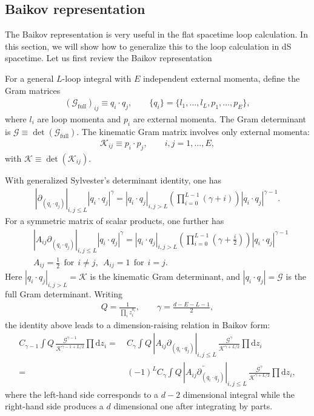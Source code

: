 \documentclass[a4paper]{article}
\newcommand{\n}{\nonumber}
\def\di{{\mathrm{d}}}
\newcommand{\mG}{\mathcal{G}}
\newcommand{\mK}{\mathcal{K}}
\begin{document}
\subsection{Baikov representation}
The Baikov representation is very useful in the flat spacetime loop calculation. In this section, we will show how to generalize this to the loop calculation in dS spacetime. Let us first review the Baikov representation

For a general $L$-loop integral with $E$ independent external momenta, define the Gram matrices
\begin{align}
	(\mG_{\text{full}})_{ij} \equiv q_i \cdotp q_j, \qquad \{q_i\} = \{l_1,\dots,l_L,p_1,\dots,p_E\},
\end{align}
where $l_i$ are loop momenta and $p_i$ are external momenta. The Gram determinant is $\mG \equiv \det(\mG_{\text{full}})$. The kinematic Gram matrix involves only external momenta:
\begin{align}
	\mK_{ij} \equiv p_i \cdotp p_j, \qquad i,j = 1,\dots,E,
\end{align}
with $\mK \equiv \det(\mK_{ij})$.

With generalized Sylvester's determinant identity, one has
\begin{align}
	|\partial_{(q_i\cdotp q_j)}|_{i,j\leq L} |q_i\cdotp q_j|^\gamma
	= |q_i\cdotp q_j|_{i,j> L}\left(\prod_{i=0}^{L-1} (\gamma+i)\right)|q_i\cdotp q_j|^{\gamma-1}.
\end{align}
For a symmetric matrix of scalar products, one further has
\begin{align}
	&|A_{ij} \partial_{(q_i\cdotp q_j)}|_{i,j\leq L} |q_i\cdotp q_j|^\gamma = |q_i\cdotp q_j|_{i,j> L}  \left(\prod_{i=0}^{L-1} \left(\gamma+\frac{i}{2}\right)\right)   |q_i\cdotp q_j|^{\gamma-1}  \n\\
	&A_{ij}=\frac{1}{2} ~~\text{for}~~i\neq j,  ~~A_{ij}=1 ~~\text{for}~~i=j.
\end{align}
Here $|q_i\cdotp q_j|_{i,j> L} = \mK$ is the kinematic Gram determinant, and $|q_i\cdotp q_j| = \mG$ is the full Gram determinant. Writing
\begin{align}
	Q=\frac{1}{\prod_i z_i^{a_i}},\qquad \gamma=\frac{d-E-L-1}{2},
\end{align}
the identity above leads to a dimension-raising relation in Baikov form:
\begin{align}
	C_{\gamma-1}\!\int Q\,\frac{\mG^{\gamma-1}}{\mK^{\gamma-1+L/2}}\prod \di z_i
	=&~C_{\gamma}\!\int Q\,|A_{ij} \partial_{(q_i\cdotp q_j)}|_{i,j\leq L}\,
	\frac{\mG^\gamma}{\mK^{\gamma+L/2}}\prod \di z_i \n\\
	=&~(-1)^L C_{\gamma}\!\int Q\,|\overleftarrow{A_{ij} \partial_{(q_i\cdotp q_j)}}|_{i,j\leq L}\,
	\frac{\mG^\gamma}{\mK^{\gamma+L/2}}\prod \di z_i,
\end{align}
where the left-hand side corresponds to a $d-2$ dimensional integral while the right-hand side produces a $d$ dimensional one after integrating by parts.
\end{document}
